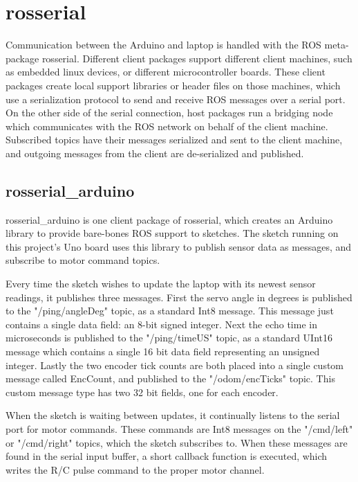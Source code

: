 \section{rosserial} \label{sectionRosSerial}
Communication between the Arduino and laptop is handled with the ROS meta-package rosserial. Different client packages support different client machines, such as embedded linux devices, or different microcontroller boards. These client packages create local support libraries or header files on those machines, which use a serialization protocol to send and receive ROS messages over a serial port. On the other side of the serial connection, host packages run a bridging node which communicates with the ROS network on behalf of the client machine. Subscribed topics have their messages serialized and sent to the client machine, and outgoing messages from the client are de-serialized and published. 

\subsection{rosserial\_arduino}
rosserial\_arduino is one client package of rosserial, which creates an Arduino library to provide bare-bones ROS support to sketches. The sketch running on this project's Uno board uses this library to publish sensor data as messages, and subscribe to motor command topics.

Every time the sketch wishes to update the laptop with its newest sensor readings, it publishes three messages. First the servo angle in degrees is published to the "/ping/angleDeg" topic, as a standard Int8 message. This message just contains a single data field: an 8-bit signed integer. Next the echo time in microseconds is published to the "/ping/timeUS" topic, as a standard UInt16 message which contains a single 16 bit data field representing an unsigned integer. Lastly the two encoder tick counts are both placed into a single custom message called EncCount, and published to the "/odom/encTicks" topic. This custom message type has two 32 bit fields, one for each encoder.

When the sketch is waiting between updates, it continually listens to the serial port for motor commands. These commands are Int8 messages on the "/cmd/left" or "/cmd/right" topics, which the sketch subscribes to. When these messages are found in the serial input buffer, a short callback function is executed, which writes the R/C pulse command to the proper motor channel.

